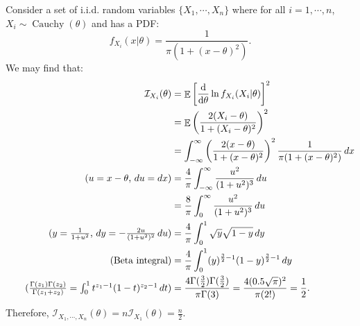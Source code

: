 \documentclass{huhtakm-template-book-v2}
\DeclareMathOperator{\E}{\mathbb{E}}
\DeclareMathOperator{\Cauchy}{Cauchy}
\begin{document}
    \begin{eg}
        Consider a set of i.i.d. random variables $\{X_{1}, \cdots, X_{n}\}$ where for all $i = 1, \cdots, n$, $X_{i} \sim \Cauchy(\theta)$ and has a PDF:
        \begin{equation*}
            f_{X_{i}}(x | \theta) = \frac{1}{\pi(1 + (x - \theta)^{2})}.
        \end{equation*}
        We may find that:
        \begin{align*}
            \mathcal{I}_{X_{i}}(\theta) &= \E\left[\odv*{}{\theta} \ln{f_{X_{i}}(X_{i} | \theta)}\right]^{2}\\
            &= \E\left(\frac{2(X_{i} - \theta)}{1 + (X_{i} - \theta)^{2}}\right)^{2}\\
            &= \intinfty \left(\frac{2(x - \theta)}{1 + (x - \theta)^{2}}\right)^{2} \frac{1}{\pi(1 + (x - \theta)^{2})} \, dx\\
            \tag{$u = x - \theta$, $du = dx$}
            &= \frac{4}{\pi} \intinfty \frac{u^{2}}{(1 + u^{2})^{3}} \, du\\
            &= \frac{8}{\pi} \int_{0}^{\infty} \frac{u^{2}}{(1 + u^{2})^{3}} \, du\\
            \tag{$y = \frac{1}{1 + u^{2}}$, $dy = -\frac{2u}{(1 + u^{2})^{2}} \, du$}
            &= \frac{4}{\pi} \int_{0}^{1} \sqrt{y}\sqrt{1 - y} \, dy\\
            \tag{Beta integral}
            &= \frac{4}{\pi} \int_{0}^{1} (y)^{\frac{3}{2} - 1}(1 - y)^{\frac{3}{2} - 1} \, dy\\
            \tag{$\frac{\Gamma(z_{1})\Gamma(z_{2})}{\Gamma(z_{1} + z_{2})} = \int_{0}^{1} t^{z_{1} - 1}(1 - t)^{z_{2} - 1} \, dt$}
            &= \frac{4\Gamma(\frac{3}{2})\Gamma(\frac{3}{2})}{\pi\Gamma(3)} = \frac{4(0.5\sqrt{\pi})^{2}}{\pi(2!)} = \frac{1}{2}.
        \end{align*}
        Therefore, $\mathcal{I}_{X_{1}, \cdots, X_{n}}(\theta) = n\mathcal{I}_{X_{1}}(\theta) = \frac{n}{2}$.
    \end{eg}
    \newpage
\end{document}
